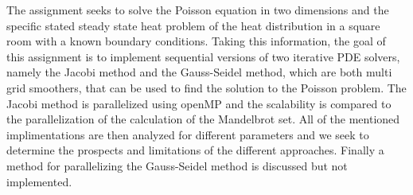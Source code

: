 The assignment seeks to solve the Poisson equation in two dimensions and the specific stated steady state heat problem of the heat distribution in a square room with a known boundary conditions. Taking this information, the goal of this assignment is to implement sequential versions of two iterative PDE solvers, namely the Jacobi method and the Gauss-Seidel method, which are both multi grid smoothers, that can be used to find the solution to the Poisson problem. The Jacobi method is parallelized using openMP and the scalability is compared to the parallelization of the calculation of the Mandelbrot set. All of the mentioned implimentations are then analyzed for different parameters and we seek to determine the prospects and limitations of the different approaches. Finally a method for parallelizing the Gauss-Seidel method is discussed but not implemented.

